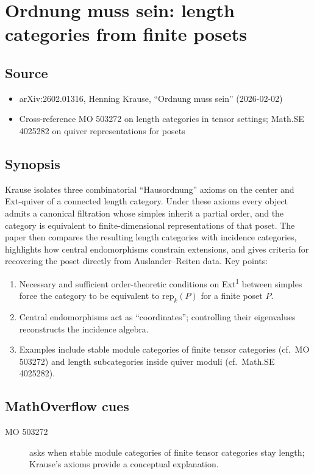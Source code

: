 \section*{Ordnung muss sein: length categories from finite posets}
\subsection*{Source}
\begin{itemize}
  \item arXiv:2602.01316, Henning Krause, ``Ordnung muss sein'' (2026-02-02)
  \item Cross-reference MO 503272 on length categories in tensor settings; Math.SE 4025282 on quiver representations for posets
\end{itemize}
\subsection*{Synopsis}
Krause isolates three combinatorial ``Hausordnung'' axioms on the center and Ext-quiver of a connected length category. Under these axioms every object admits a canonical filtration whose simples inherit a partial order, and the category is equivalent to finite-dimensional representations of that poset. The paper then compares the resulting length categories with incidence categories, highlights how central endomorphisms constrain extensions, and gives criteria for recovering the poset directly from Auslander--Reiten data. Key points:
\begin{enumerate}
  \item Necessary and sufficient order-theoretic conditions on Ext\textsuperscript{1} between simples force the category to be equivalent to $\mathrm{rep}_k(P)$ for a finite poset $P$.
  \item Central endomorphisms act as ``coordinates''; controlling their eigenvalues reconstructs the incidence algebra.
  \item Examples include stable module categories of finite tensor categories (cf.\ MO 503272) and length subcategories inside quiver moduli (cf.\ Math.SE 4025282).
\end{enumerate}
\subsection*{MathOverflow cues}
\begin{description}
  \item[MO 503272] asks when stable module categories of finite tensor categories stay length; Krause's axioms provide a conceptual explanation.
\end{description}
